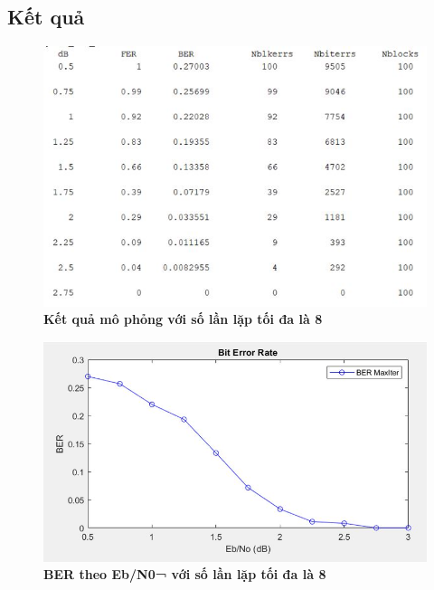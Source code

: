 \documentclass{article}
\begin{document}
\subsection{Kết quả}
\begin{figure}[H]
    \centering
    \includegraphics[width=12cm]{images/ketqua1.JPG}
    \caption[Kết quả mô phỏng với số lần lặp tối đa là 8]{\bfseries\fontsize{12pt}{0pt} \selectfont Kết quả mô phỏng với số lần lặp tối đa là 8} %
    \label{hinh23}
\end{figure}
\begin{figure}[H]
    \centering
    \includegraphics[width=12cm]{images/BER.JPG}
    \caption[BER theo Eb/N0¬ với số lần lặp tối đa là 8]{\bfseries\fontsize{12pt}{0pt} \selectfont BER theo Eb/N0¬ với số lần lặp tối đa là 8} %
    \label{hinh24}
\end{figure}
\end{document}
